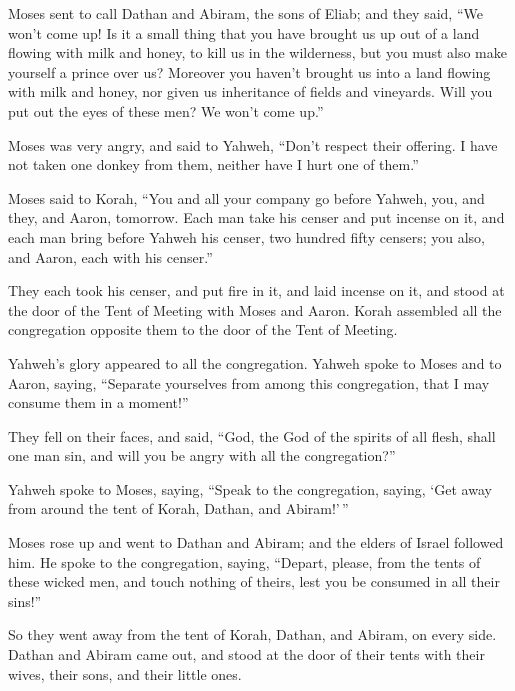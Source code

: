  Moses sent to call Dathan and Abiram, the sons of Eliab;
and they said, ``We won't come up!  Is it a small thing
that you have brought us up out of a land flowing with milk and honey,
to kill us in the wilderness, but you must also make yourself a prince
over us?  Moreover you haven't brought us into a land
flowing with milk and honey, nor given us inheritance of fields and
vineyards. Will you put out the eyes of these men? We won't come up.''

 Moses was very angry, and said to Yahweh, ``Don't
respect their offering. I have not taken one donkey from them, neither
have I hurt one of them.''

 Moses said to Korah, ``You and all your company go
before Yahweh, you, and they, and Aaron, tomorrow.  Each
man take his censer and put incense on it, and each man bring before
Yahweh his censer, two hundred fifty censers; you also, and Aaron, each
with his censer.''

 They each took his censer, and put fire in it, and laid
incense on it, and stood at the door of the Tent of Meeting with Moses
and Aaron.  Korah assembled all the congregation opposite
them to the door of the Tent of Meeting.

Yahweh's glory appeared to all the congregation.  Yahweh
spoke to Moses and to Aaron, saying,  ``Separate
yourselves from among this congregation, that I may consume them in a
moment!''

 They fell on their faces, and said, ``God, the God of
the spirits of all flesh, shall one man sin, and will you be angry with
all the congregation?''

 Yahweh spoke to Moses, saying,  ``Speak
to the congregation, saying, `Get away from around the tent of Korah,
Dathan, and Abiram!'\,''

 Moses rose up and went to Dathan and Abiram; and the
elders of Israel followed him.  He spoke to the
congregation, saying, ``Depart, please, from the tents of these wicked
men, and touch nothing of theirs, lest you be consumed in all their
sins!''

 So they went away from the tent of Korah, Dathan, and
Abiram, on every side. Dathan and Abiram came out, and stood at the door
of their tents with their wives, their sons, and their little ones.

